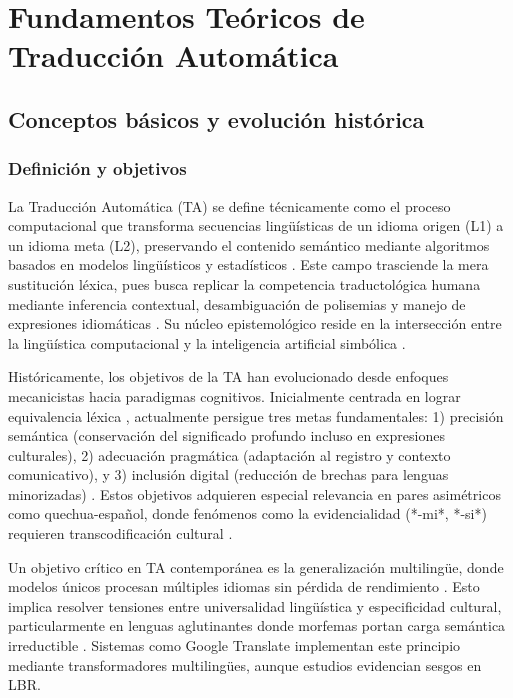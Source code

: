 

\chapter{Fundamentos Teóricos de Traducción Automática}
    \section{Conceptos básicos y evolución histórica}
        \subsection{Definición y objetivos }
        La Traducción Automática (TA) se define técnicamente como el proceso computacional que transforma secuencias lingüísticas de un idioma origen (L1) a un idioma meta (L2), preservando el contenido semántico mediante algoritmos basados en modelos lingüísticos y estadísticos \cite{hutchins1986machine}. Este campo trasciende la mera sustitución léxica, pues busca replicar la competencia traductológica humana mediante inferencia contextual, desambiguación de polisemias y manejo de expresiones idiomáticas \cite{koehn2020neural}. Su núcleo epistemológico reside en la intersección entre la lingüística computacional y la inteligencia artificial simbólica \cite{arnold1994machine}.

        Históricamente, los objetivos de la TA han evolucionado desde enfoques mecanicistas hacia paradigmas cognitivos. Inicialmente centrada en lograr equivalencia léxica \cite{weaver1952translation}, actualmente persigue tres metas fundamentales: 1) precisión semántica (conservación del significado profundo incluso en expresiones culturales), 2) adecuación pragmática (adaptación al registro y contexto comunicativo), y 3) inclusión digital (reducción de brechas para lenguas minorizadas) \cite{neubig2017neural}. Estos objetivos adquieren especial relevancia en pares asimétricos como quechua-español, donde fenómenos como la evidencialidad (*-mi*, *-si*) requieren transcodificación cultural \cite{adelaar2004}.
        
        Un objetivo crítico en TA contemporánea es la generalización multilingüe, donde modelos únicos procesan múltiples idiomas sin pérdida de rendimiento \cite{wu2016google}. Esto implica resolver tensiones entre universalidad lingüística y especificidad cultural, particularmente en lenguas aglutinantes donde morfemas portan carga semántica irreductible \cite{bender2011achieving}. Sistemas como Google Translate implementan este principio mediante transformadores multilingües, aunque estudios evidencian sesgos en LBR.
        
